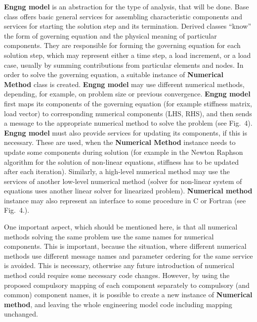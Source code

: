\documentclass[a4paper]{article}
\newcommand{\class}[1]{{\bf #1}}
\begin{document}
\class{Engng model} is an abstraction for the type of analysis, that will be
done. Base class offers basic general services for assembling
characteristic components and services for starting the solution step and
its termination. Derived classes ``know'' the form of governing
equation and the physical meaning of  particular components. 
They are responsible for forming the governing equation for each solution
step, which may represent either a time step, a load increment, or a load
case, usually by summing contributions from particular elements and nodes.
In order
to solve the governing equation, a suitable instance of \class{Numerical Method}
class is created. \class{Engng model} may use different numerical methods,
depending, for example, on problem size or previous convergence. \class{Engng
model} first maps its components of the governing equation (for example
stiffness matrix, load vector) to corresponding numerical components
(LHS, RHS), and then sends a message to the appropriate numerical method to solve the
problem (see Fig.~4). 
\class{Engng model} must also provide services for updating its
components, if this is necessary. These are used, when the \class{Numerical
Method} instance needs to update  some components during solution (for
example in the Newton Raphson algorithm for the solution of non-linear
equations, stiffness has to be updated after each
iteration). Similarly,  
a high-level numerical method may use the services of another
low-level numerical method (solver for non-linear system  of equations
uses another linear solver for linearized problem). \class{Numerical method}
instance may also represent an interface to some procedure in C or
Fortran (see Fig.~4.). 



One important aspect, which should be mentioned here, is that all
numerical methods solving the same problem use the same names for numerical
components. This is important, because the
situation, where different numerical methods use different message
names and parameter ordering for the same service is avoided. This is
necessary, otherwise any future introduction of numerical method
could require some necessary code changes. However, by using the
proposed compulsory mapping of each component separately to
compulsory (and common) component names, it is possible to create a new
instance of \class{Numerical method}, and leaving the whole engineering model code
including mapping unchanged. 
\end{document}
